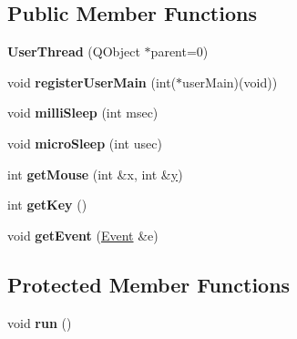 \subsection*{Public Member Functions}
\begin{DoxyCompactItemize}
\item 
\hypertarget{group___graphics_internal_ga520a11a377381bb516be45e6d5564a51}{{\bfseries User\-Thread} (Q\-Object $\ast$parent=0)}\label{group___graphics_internal_ga520a11a377381bb516be45e6d5564a51}

\item 
\hypertarget{group___graphics_internal_ga205cb5d1ecd1b0a8473ec0233724b8d9}{void {\bfseries register\-User\-Main} (int($\ast$user\-Main)(void))}\label{group___graphics_internal_ga205cb5d1ecd1b0a8473ec0233724b8d9}

\item 
\hypertarget{group___graphics_internal_gaacb94ff196c97609974b21595461e093}{void {\bfseries milli\-Sleep} (int msec)}\label{group___graphics_internal_gaacb94ff196c97609974b21595461e093}

\item 
\hypertarget{group___graphics_internal_ga64b410b838a1bda3e1a16f1b4171eb99}{void {\bfseries micro\-Sleep} (int usec)}\label{group___graphics_internal_ga64b410b838a1bda3e1a16f1b4171eb99}

\item 
\hypertarget{group___graphics_internal_ga4ac6dfc380bd4b753f2433a081a51942}{int {\bfseries get\-Mouse} (int \&x, int \&\hyperlink{group___channel_accessors_gac90c52c5b3a7b2a7e3761e6e84f25778}{y})}\label{group___graphics_internal_ga4ac6dfc380bd4b753f2433a081a51942}

\item 
\hypertarget{group___graphics_internal_gaa5cbe387ac3ae002933daa7d8371d17b}{int {\bfseries get\-Key} ()}\label{group___graphics_internal_gaa5cbe387ac3ae002933daa7d8371d17b}

\item 
\hypertarget{group___graphics_internal_ga66b52a9903f2651cd0968a9282d9d740}{void {\bfseries get\-Event} (\hyperlink{struct_d_o_1_1_event}{Event} \&e)}\label{group___graphics_internal_ga66b52a9903f2651cd0968a9282d9d740}

\end{DoxyCompactItemize}
\subsection*{Protected Member Functions}
\begin{DoxyCompactItemize}
\item 
\hypertarget{group___graphics_internal_ga13a43e6d814de94978c515cb084873b1}{void {\bfseries run} ()}\label{group___graphics_internal_ga13a43e6d814de94978c515cb084873b1}

\end{DoxyCompactItemize}


